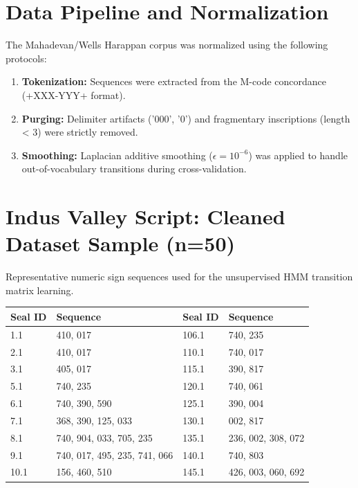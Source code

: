 \documentclass[11pt,oneside,openany]{book}
\begin{document}
\section{Data Pipeline and Normalization}
The Mahadevan/Wells Harappan corpus was normalized using the following protocols:
\begin{enumerate}
    \item \textbf{Tokenization:} Sequences were extracted from the M-code concordance (+XXX-YYY+ format).
    \item \textbf{Purging:} Delimiter artifacts ('000', '0') and fragmentary inscriptions (length < 3) were strictly removed.
    \item \textbf{Smoothing:} Laplacian additive smoothing ($\epsilon = 10^{-6}$) was applied to handle out-of-vocabulary transitions during cross-validation.
\end{enumerate}

\section{Indus Valley Script: Cleaned Dataset Sample (n=50)}
Representative numeric sign sequences used for the unsupervised HMM transition matrix learning.

\begin{table}[h]
\centering
\begin{tabular}{ll|ll} \toprule
\textbf{Seal ID} & \textbf{Sequence} & \textbf{Seal ID} & \textbf{Sequence} \\ \midrule
1.1 & 410, 017 & 106.1 & 740, 235 \\
2.1 & 410, 017 & 110.1 & 740, 017 \\
3.1 & 405, 017 & 115.1 & 390, 817 \\
5.1 & 740, 235 & 120.1 & 740, 061 \\
6.1 & 740, 390, 590 & 125.1 & 390, 004 \\
7.1 & 368, 390, 125, 033 & 130.1 & 002, 817 \\
8.1 & 740, 904, 033, 705, 235 & 135.1 & 236, 002, 308, 072 \\
9.1 & 740, 017, 495, 235, 741, 066 & 140.1 & 740, 803 \\
10.1 & 156, 460, 510 & 145.1 & 426, 003, 060, 692 \\
\bottomrule
\end{tabular}
\end{table}
\end{document}
